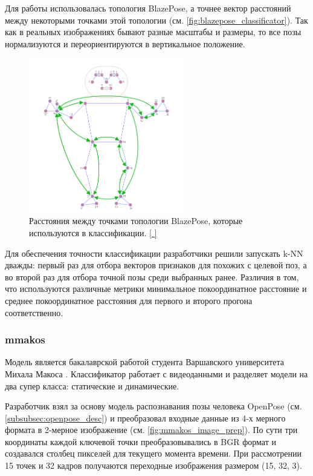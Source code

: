 Для работы использовалась топология BlazePose, а точнее вектор расстояний между некоторыми точками этой топологии (см. \autoref{fig:blazepose_classificator}). Так как в реальных изображениях бывают разные масштабы и размеры, то все позы нормализуются и переориентируются в вертикальное положение.

\begin{figure}[h]
	\centering
	\includegraphics[width=0.6\textwidth]{./images/Classificators/BlazePose}
	\caption{Расстояния между точками топологии BlazePose, которые используются в классификации. \href{https://google.github.io/mediapipe/images/mobile/pose_classification_pairwise_distances.png}{[ ]}}
	\label{fig:blazepose_classificator}
\end{figure}

Для обеспечения точности классификации разработчики решили запускать k-NN дважды: первый раз для отбора векторов признаков для похожих с целевой поз, а во второй раз для отбора точной позы среди выбранных ранее. Различия в том, что используются различные метрики минимальное покоординатное расстояние и среднее покоординатное расстояния для первого и второго прогона соответственно.



\subsubsection{mmakos}
\label{subsubsec:mmakos_desc}

Модель является бакалаврской работой студента Варшавского университета Михала Макоса \cite{mmakos}. Классификатор работает с видеоданными и разделяет модели на два супер класса: статические и динамические.

Разработчик взял за основу модель распознавания позы человека OpenPose (см. \autoref{subsubsec:openpose_desc}) и преобразовал входные данные из 4-х мерного формата в 2-мерное изображение (см. \autoref{fig:mmakos_image_prep}). По сути три координаты каждой ключевой точки преобразовывались в BGR формат и создавался столбец пикселей для текущего момента времени. При рассмотрении 15 точек и 32 кадров получаются переходные изображения размером (15, 32, 3).

